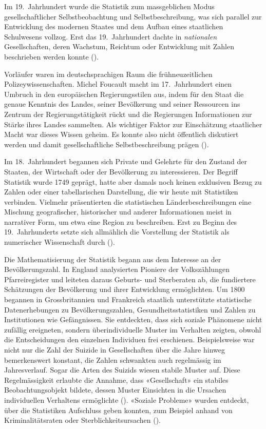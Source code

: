 Im 19.~Jahrhundert wurde die Statistik zum massgeblichen Modus gesellschaftlicher Selbstbeobachtung und Selbstbeschreibung, was sich parallel zur Entwicklung des modernen Staates und dem Aufbau eines staatlichen Schulwesens vollzog. Erst das 19.~Jahrhundert dachte in \textit{nationalen} Gesellschaften, deren Wachstum, Reichtum oder Entwicklung mit Zahlen beschrieben werden konnte (\cite[57-62]{osterhammel_verwandlung_2010}).

Vorläufer waren im deutschsprachigen Raum die frühneuzeitlichen Polizeywissenschaften. Michel Foucault macht im 17.~Jahrhundert einen Umbruch in den europäischen Regierungsstilen aus, indem für den Staat die genaue Kenntnis des Landes, seiner Bevölkerung und seiner Ressourcen ins Zentrum der Regierungstätigkeit rückt und die Regierungen Informationen zur Stärke ihres Landes sammelten. Als wichtiger Faktor zur Einschätzung staatlicher Macht war dieses Wissen geheim. Es konnte also nicht öffentlich diskutiert werden und damit gesellschaftliche Selbstbeschreibung prägen (\cite[395-400]{foucault_geschichte_2004}). 

Im 18.~Jahrhundert begannen sich Private und Gelehrte für den Zustand der Staaten, der Wirtschaft oder der Bevölkerung zu interessieren. Der Begriff Statistik wurde 1749 geprägt, hatte aber damals noch keinen exklusiven Bezug zu Zahlen oder einer tabellarischen Darstellung, die wir heute mit Statistiken verbinden. Vielmehr präsentierten die statistischen Länderbeschreibungen eine Mischung geografischer, historischer und anderer Informationen meist in narrativer Form, um etwa eine Region zu beschreiben. Erst zu Beginn des 19.~Jahrhunderts setzte sich allmählich die Vorstellung der Statistik als numerischer Wissenschaft durch (\cite[16-26]{hacking_taming_1990}). 

Die Mathematisierung der Statistik begann aus dem Interesse an der Bevölkerungszahl. In England analysierten Pioniere der Volkszählungen Pfarreiregister und leiteten daraus Geburts- und Sterberaten ab, die fundiertere Schätzungen der Bevölkerung und ihrer Entwicklung ermöglichten. Um 1800 begannen in Grossbritannien und Frankreich staatlich unterstützte statistische Datenerhebungen zu Bevölkerungszahlen, Gesundheitsstatistiken und Zahlen zu Institutionen wie Gefängnissen. Sie entdeckten, dass sich soziale Phänomene nicht zufällig ereigneten, sondern überindividuelle Muster im Verhalten zeigten, obwohl die Entscheidungen den einzelnen Individuen frei erschienen. Beispielsweise war nicht nur die Zahl der Suizide in Gesellschaften über die Jahre hinweg bemerkenswert konstant, die Zahlen schwankten auch regelmässig im Jahresverlauf. Sogar die Arten des Suizids wiesen stabile Muster auf. Diese Regelmässigkeit erlaubte die Annahme, dass «Gesellschaft» ein stabiles Beobachtungsobjekt bildete, dessen Muster Einsichten in die Ursachen individuellen Verhaltens ermöglichte (\cite[75-76]{hacking_taming_1990}). «Soziale Probleme» wurden entdeckt, über die Statistiken Aufschluss geben konnten, zum Beispiel anhand von Kriminalitätsraten oder Sterblichkeitsursachen (\cite[27-31]{porter_rise_1986}).

